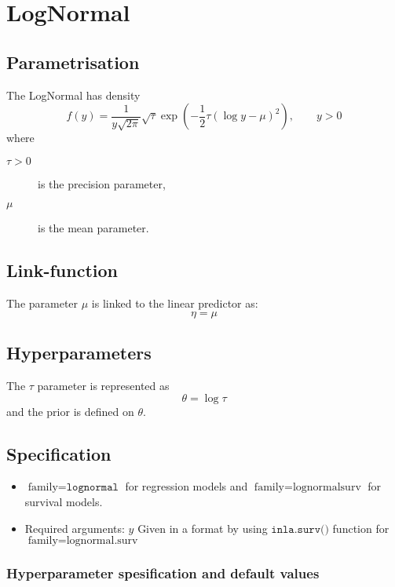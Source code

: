 \documentclass[a4paper,11pt]{article}
\begin{document}
\section*{LogNormal}

\subsection*{Parametrisation}

The LogNormal has density
\begin{displaymath}
    f(y) = \frac{1}{y\sqrt{2\pi}} \sqrt{\tau} \exp\left(
      -\frac{1}{2} \tau (\log y - \mu)^{2}
    \right), \qquad y > 0
\end{displaymath}
where
\begin{description}
\item[$\tau > 0$] is the precision parameter,
\item[$\mu$] is the mean parameter.
\end{description}

\subsection*{Link-function}

The parameter $\mu$ is linked to the linear predictor as:
\[
\eta = \mu
\]
\subsection*{Hyperparameters}

The $\tau$ parameter is represented as
\[
\theta = \log\tau
\]
and the prior is defined on $\theta$.

\subsection*{Specification}

\begin{itemize}
\item $\text{family}=\texttt{lognormal}$ for regression models and
    $\text{family}=\text{lognormalsurv}$ for survival models.
\item Required arguments: $y$ Given in a format by using
    $\texttt{inla.surv()}$ function for
    $\text{family}=\text{lognormal.surv}$
\end{itemize}

\subsubsection*{Hyperparameter spesification and default values}
\end{document}
